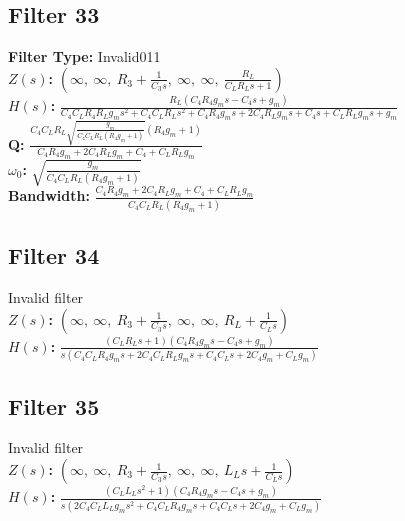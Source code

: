 \documentclass{article}
\begin{document}
\subsection*{Filter 33}
\textbf{Filter Type:} Invalid011 \\ 
\textbf{$Z(s)$:} $\left( \infty, \  \infty, \  R_{3} + \frac{1}{C_{3} s}, \  \infty, \  \infty, \  \frac{R_{L}}{C_{L} R_{L} s + 1}\right)$ \\ 
\textbf{$H(s)$:} $\frac{R_{L} \left(C_{4} R_{4} g_{m} s - C_{4} s + g_{m}\right)}{C_{4} C_{L} R_{4} R_{L} g_{m} s^{2} + C_{4} C_{L} R_{L} s^{2} + C_{4} R_{4} g_{m} s + 2 C_{4} R_{L} g_{m} s + C_{4} s + C_{L} R_{L} g_{m} s + g_{m}}$ \\ 
\textbf{Q:} $\frac{C_{4} C_{L} R_{L} \sqrt{\frac{g_{m}}{C_{4} C_{L} R_{L} \left(R_{4} g_{m} + 1\right)}} \left(R_{4} g_{m} + 1\right)}{C_{4} R_{4} g_{m} + 2 C_{4} R_{L} g_{m} + C_{4} + C_{L} R_{L} g_{m}}$ \\ 
\textbf{$\omega_0$:} $\sqrt{\frac{g_{m}}{C_{4} C_{L} R_{L} \left(R_{4} g_{m} + 1\right)}}$ \\ 
\textbf{Bandwidth:} $\frac{C_{4} R_{4} g_{m} + 2 C_{4} R_{L} g_{m} + C_{4} + C_{L} R_{L} g_{m}}{C_{4} C_{L} R_{L} \left(R_{4} g_{m} + 1\right)}$ \\ 
\subsection*{Filter 34}
Invalid filter \\ 
\textbf{$Z(s)$:} $\left( \infty, \  \infty, \  R_{3} + \frac{1}{C_{3} s}, \  \infty, \  \infty, \  R_{L} + \frac{1}{C_{L} s}\right)$ \\ 
\textbf{$H(s)$:} $\frac{\left(C_{L} R_{L} s + 1\right) \left(C_{4} R_{4} g_{m} s - C_{4} s + g_{m}\right)}{s \left(C_{4} C_{L} R_{4} g_{m} s + 2 C_{4} C_{L} R_{L} g_{m} s + C_{4} C_{L} s + 2 C_{4} g_{m} + C_{L} g_{m}\right)}$ \\ 
\subsection*{Filter 35}
Invalid filter \\ 
\textbf{$Z(s)$:} $\left( \infty, \  \infty, \  R_{3} + \frac{1}{C_{3} s}, \  \infty, \  \infty, \  L_{L} s + \frac{1}{C_{L} s}\right)$ \\ 
\textbf{$H(s)$:} $\frac{\left(C_{L} L_{L} s^{2} + 1\right) \left(C_{4} R_{4} g_{m} s - C_{4} s + g_{m}\right)}{s \left(2 C_{4} C_{L} L_{L} g_{m} s^{2} + C_{4} C_{L} R_{4} g_{m} s + C_{4} C_{L} s + 2 C_{4} g_{m} + C_{L} g_{m}\right)}$ \\ 
\end{document}
